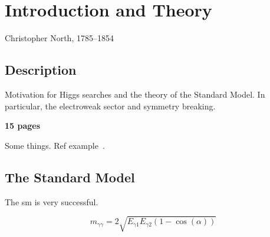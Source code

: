 \chapter{Introduction and Theory}
\label{chap:intro}
{Christopher North, 1785--1854}

\section{Description}

Motivation for Higgs searches and the theory of the Standard Model. In particular, the electroweak sector and symmetry breaking.

\textbf{15 pages}

Some things. Ref example~\cite{Phys.Rev.Lett.19.1264, Phys.Rev.D2.1285,hep-ph/0410370}.

\section{The Standard Model}
\label{sec:standardmodel}

The \acf{sm} is very successful.


\begin{equation}
	m_{\gamma\gamma} = 2\sqrt{E_{\gamma1}E_{\gamma2}(1-\cos(\alpha))}
\label{eq:invmass}
\end{equation}
